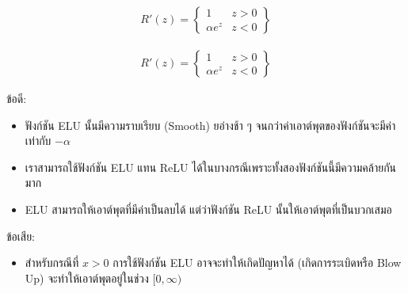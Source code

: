 \begin{itemize}
\begin{figure}[H]
\begin{subfigure}{0.5\textwidth}
            \caption{%
                \begin{equation}
                    \begin{split}R'(z) = \begin{Bmatrix} 1 & z>0 \\
                        \alpha e^z & z<0 \end{Bmatrix}\end{split}
                \end{equation}
            }
            \label{fig:actfunc_elu_der}
        \end{subfigure}
    \end{figure}
    ข้อดี:
    \begin{itemize}
        \item ฟังก์ชัน ELU นั้นมีความราบเรียบ (Smooth) ยอ่างช้า ๆ จนกว่าค่าเอาต์พุตของฟังก์ชันจะมีค่าเท่ากับ $-\alpha$
        
        \item เราสามารถใช้ฟังก์ชัน ELU แทน ReLU ได้ในบางกรณีเพราะทั้งสองฟังก์ชันนี้มีความคล้ายกันมาก
        
        \item ELU สามารถให้เอาต์พุตที่มีค่าเป็นลบได้ แต่ว่าฟังก์ชัน ReLU นั้นให้เอาต์พุตที่เป็นบวกเสมอ
    \end{itemize}
    ข้อเสีย:
    \begin{itemize}
        \item สำหรับกรณีที่ $x > 0$ การใช้ฟังก์ชัน ELU อาจจะทำให้เกิดปัญหาได้ (เกิดการระเบิดหรือ Blow Up) จะทำให้เอาต์พุตอยู่ในช่วง 
        $[0,\infty)$
    \end{itemize}


\end{itemize}
